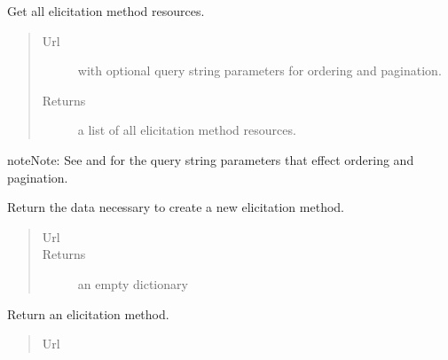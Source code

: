 \documentclass[letterpaper,10pt,english]{sphinxmanual}
\begin{document}
\begin{fulllineitems}
\begin{fulllineitems}
\label{api:onlinelinguisticdatabase.controllers.elicitationmethods.ElicitationmethodsController.index}
Get all elicitation method resources.
\begin{quote}\begin{description}
\item[{Url }] \leavevmode
{} with optional query string parameters
for ordering and pagination.

\item[{Returns}] \leavevmode
a list of all elicitation method resources.

\end{description}\end{quote}

\begin{notice}{note}{Note:}
See  and  for the
query string parameters that effect ordering and pagination.
\end{notice}

\end{fulllineitems}


\begin{fulllineitems}
\label{api:onlinelinguisticdatabase.controllers.elicitationmethods.ElicitationmethodsController.new}
Return the data necessary to create a new elicitation method.
\begin{quote}\begin{description}
\item[{Url }] \leavevmode
{}

\item[{Returns}] \leavevmode
an empty dictionary

\end{description}\end{quote}

\end{fulllineitems}


\begin{fulllineitems}
\label{api:onlinelinguisticdatabase.controllers.elicitationmethods.ElicitationmethodsController.show}
Return an elicitation method.
\begin{quote}\begin{description}
\item[{Url }] \leavevmode
{}


\end{description}
\end{quote}
\end{fulllineitems}
\end{fulllineitems}
\end{document}
